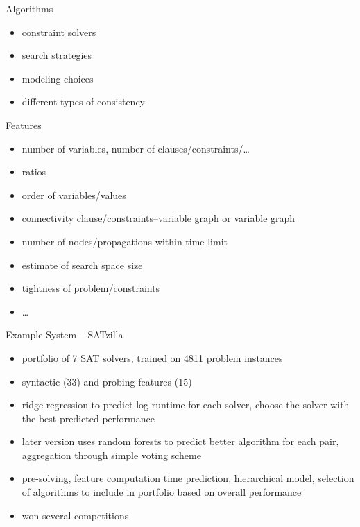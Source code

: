 \begin{frame}[c]{Algorithms}
    \begin{itemize}
        \item constraint solvers
        \item search strategies
        \item modeling choices
        \item different types of consistency
    \end{itemize}
\end{frame}

\begin{frame}[c]{Features}
    \begin{itemize}
        \item number of variables, number of clauses/constraints/\ldots
        \item ratios
        \item order of variables/values
        \item connectivity clause/constraints--variable graph or variable graph
        \item number of nodes/propagations within time limit
        \item estimate of search space size
        \item tightness of problem/constraints
        \item \ldots
    \end{itemize}
\end{frame}

\begin{frame}[c]{Example System -- SATzilla}
\begin{itemize}
\item portfolio of 7 SAT solvers, trained on 4811 problem instances
\item syntactic (33) and probing features (15)
\item ridge regression to predict log runtime for each solver, choose the solver with the best predicted performance
\item later version uses random forests to predict better algorithm for each
 pair, aggregation through simple voting scheme
\item pre-solving, feature computation time prediction, hierarchical model,
selection of algorithms to include in portfolio based on overall performance
\item won several competitions
\end{itemize}
\end{frame}

